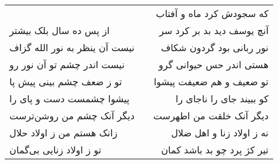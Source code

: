 \begin{center}
\begin{longtable}{l p{0.5cm} r}
&&
که سجودش کرد ماه و آفتاب
\\
از پس ده سال بلک بیشتر
&&
آنچ یوسف دید بد بر کرد سر
\\
نیست آن ینظر به نور الله گزاف
&&
نور ربانی بود گردون شکاف
\\
نیست اندر چشم تو آن نور رو
&&
هستی اندر حس حیوانی گرو
\\
تو ز ضعف چشم بینی پیش پا
&&
تو ضعیف و هم ضعیفت پیشوا
\\
پیشوا چشمست دست و پای را
&&
کو ببیند جای را ناجای را
\\
دیگر آنک چشم من روشن‌ترست
&&
دیگر آنک خلقت من اطهرست
\\
زانک هستم من ز اولاد حلال
&&
نه ز اولاد زنا و اهل ضلال
\\
تو ز اولاد زنایی بی‌گمان
&&
تیر کژ پرد چو بد باشد کمان
\\
\end{longtable}
\end{center}
